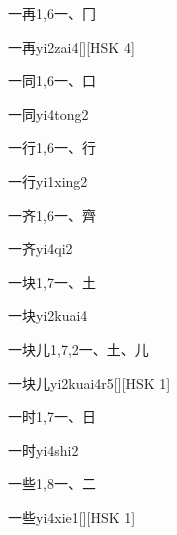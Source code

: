 \begin{entry}{一再}{1,6}{⼀、⼌}
  \begin{phonetics}{一再}{yi2zai4}[][HSK 4]
  \end{phonetics}
\end{entry}

\begin{entry}{一同}{1,6}{⼀、⼝}
  \begin{phonetics}{一同}{yi4tong2}
  \end{phonetics}
\end{entry}

\begin{entry}{一行}{1,6}{⼀、⾏}
  \begin{phonetics}{一行}{yi1xing2}
  \end{phonetics}
\end{entry}

\begin{entry}{一齐}{1,6}{⼀、⿑}
  \begin{phonetics}{一齐}{yi4qi2}
  \end{phonetics}
\end{entry}

\begin{entry}{一块}{1,7}{⼀、⼟}
  \begin{phonetics}{一块}{yi2kuai4}
  \end{phonetics}
\end{entry}

\begin{entry}{一块儿}{1,7,2}{⼀、⼟、⼉}
  \begin{phonetics}{一块儿}{yi2kuai4r5}[][HSK 1]
  \end{phonetics}
\end{entry}

\begin{entry}{一时}{1,7}{⼀、⽇}
  \begin{phonetics}{一时}{yi4shi2}
  \end{phonetics}
\end{entry}

\begin{entry}{一些}{1,8}{⼀、⼆}
  \begin{phonetics}{一些}{yi4xie1}[][HSK 1]
  \end{phonetics}
\end{entry}

